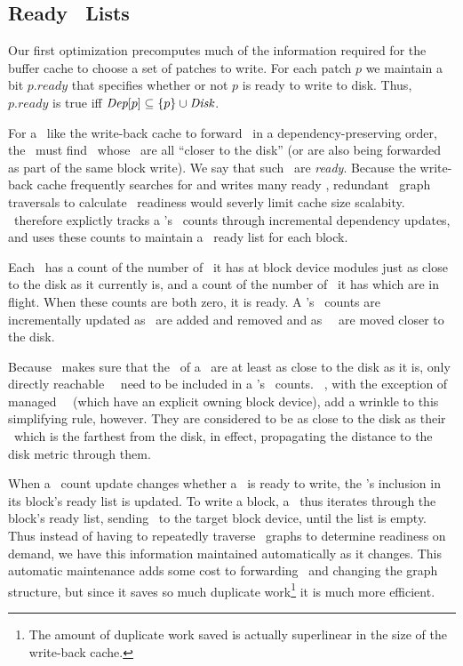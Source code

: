 
\subsection{Ready \ChDesc\ Lists}

\newcommand{\PReady}[1]{\ensuremath{#1.\textit{ready}}}

Our first optimization precomputes much of the information required for the
buffer cache to choose a set of patches to write.
%
For each patch $p$ we maintain a bit $\PReady{p}$ that specifies whether or
not $p$ is ready to write to disk.
%
Thus, $\PReady{p}$ is true iff $\PDepset{p} \subseteq \{p\} \cup \PDisk$.
%



For a \module\ like the write-back cache to forward \chdescs\ in a
dependency-preserving order, the \module\ must find \chdescs\ whose \befores\
are all ``closer to the disk'' (or are also being forwarded as part of the same
block write). We say that such \chdescs\ are \emph{ready}. Because the
write-back cache frequently searches for and writes many ready \chdescs,
redundant \chdesc\ graph traversals to calculate \chdesc\ readiness would
severly limit cache size scalabity. \Kudos\ therefore explictly tracks a
\chdesc's \before\ counts through incremental dependency updates, and uses these
counts to maintain a \chdesc\ ready list for each block.

Each \chdesc\ has a count of the number of \befores\ it has at block device
modules just as close to the disk as it currently is, and a count of the number
of \befores\ it has which are in flight. When these counts are both zero, it is
ready. A \chdesc's \before\ counts are incrementally updated as \befores\ are
added and removed and as \beforing\ \chdescs\ are moved closer to the disk.

Because \Kudos\ makes sure that the \befores\ of a \chdesc\ are at least as
close to the disk as it is, only directly reachable \beforing\ \chdescs\ need to
be included in a \chdesc's \before\ counts. \Noop\ \chdescs, with the exception
of managed \noop\ \chdescs\ (which have an explicit owning block device), add a
wrinkle to this simplifying rule, however. They are considered to be as close to
the disk as their \before\ which is the farthest from the disk, in effect,
propagating the distance to the disk metric through them.

When a \before\ count update changes whether a \chdesc\ is ready to write, the
\chdesc's inclusion in its block's ready list is updated. To write a block, a
\module\ thus iterates through the block's ready list, sending \chdescs\ to the
target block device, until the list is empty. Thus instead of having to
repeatedly traverse \chdesc\ graphs to determine readiness on demand, we have
this information maintained automatically as it changes. This automatic
maintenance adds some cost to forwarding \chdescs\ and changing the graph
structure, but since it saves so much duplicate work\footnote{The amount of
duplicate work saved is actually superlinear in the size of the write-back
cache.} it is much more efficient.
